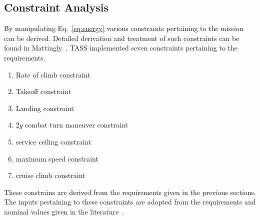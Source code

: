\documentclass[pdftex,11pt,letter]{article}
\begin{document}
\subsection{Constraint Analysis}
By manipulating Eq.~\ref{eq:energy} various constraints pertaining to the mission can be derived. Detailed derivation and treatment of such constraints can be found in Mattingly~\etal\cite{MattinglyText}. TASS implemented seven constraints pertaining to the requirements.
\begin{enumerate}
\item Rate of climb constraint
\item Takeoff constraint
\item Landing constraint
\item $2g$ combat turn maneuver constraint
\item service ceiling constraint
\item maximum speed constraint
\item cruise climb constraint
\end{enumerate}
These constrains are derived from the requirements given in the previous sections. The inputs pertaining to these constraints are adopted from the requirements and nominal values given in the literature~\cite{MattinglyText}.
\end{document}
